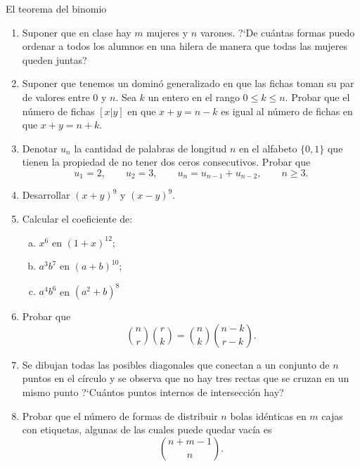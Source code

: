 \begin{section}{El teorema del binomio}
\begin{enumerate}[1)]
\item Suponer que en clase hay $m$ mujeres y $n$ varones. ?`De cuántas formas
puedo ordenar a todos los alumnos en una hilera de manera que todas las mujeres
queden juntas?

\item Suponer que tenemos un dominó generalizado en que las fichas toman su
par de valores entre $0$ y $n$. Sea $k$ un entero en el rango $0\le k \le n$.
Probar que el número de fichas $[x|y]$ en que $x+y = n-k$ es igual al número de
fichas en que  $x+y = n+k$.

\item Denotar $u_n$ la cantidad de palabras de longitud $n$ en el alfabeto
$\{0,1\}$ que tienen la propiedad de no tener dos ceros consecutivos. Probar que
$$
u_1=2,\qquad u_2=3,\qquad u_n =u_{n-1} +u_{n-2},\qquad n \ge 3.
$$

\item Desarrollar $(x+y)^9$ y $(x-y)^9$.

\item Calcular el coeficiente de:
\begin{multicols}{3}
\begin{enumerate}[a)]
	\item $x^6$ en $(1+x)^{12}$;
	
	\item $a^3b^7$ en $(a+b)^{10}$;
	
	\item $a^4b^6$ en $(a^2+b)^8$
\end{enumerate}
\end{multicols}

\item Probar que
$$
\binom{n}{r}\binom{r}{k}=\binom{n}{k}\binom{n-k}{r-k}.
$$

\item Se dibujan todas las posibles diagonales que conectan a un conjunto de $n$
puntos en el círculo y se observa que no hay tres rectas que se cruzan en un
mismo punto ?`Cuántos puntos internos de intersección hay?

\item Probar que el número de formas de distribuir $n$ bolas idénticas en $m$
cajas con etiquetas, algunas de las cuales puede quedar vacía es
$$
\binom{n+m-1}{n}.
$$


\end{enumerate}
\end{section}
